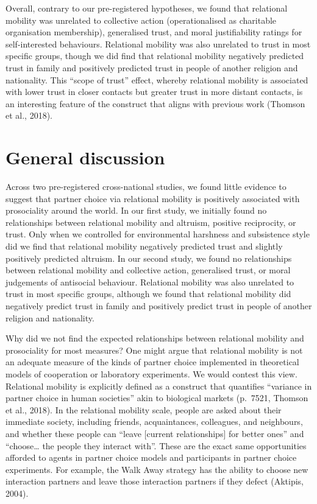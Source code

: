 \documentclass[
  man,floatsintext]{apa6}
\begin{document}
Overall, contrary to our pre-registered hypotheses, we found that relational mobility was unrelated to collective action (operationalised as charitable organisation membership), generalised trust, and moral justifiability ratings for self-interested behaviours. Relational mobility was also unrelated to trust in most specific groups, though we did find that relational mobility negatively predicted trust in family and positively predicted trust in people of another religion and nationality. This ``scope of trust'' effect, whereby relational mobility is associated with lower trust in closer contacts but greater trust in more distant contacts, is an interesting feature of the construct that aligns with previous work (Thomson et al., 2018).

\hypertarget{general-discussion}{%
\section{General discussion}\label{general-discussion}}

Across two pre-registered cross-national studies, we found little evidence to suggest that partner choice via relational mobility is positively associated with prosociality around the world. In our first study, we initially found no relationships between relational mobility and altruism, positive reciprocity, or trust. Only when we controlled for environmental harshness and subsistence style did we find that relational mobility negatively predicted trust and slightly positively predicted altruism. In our second study, we found no relationships between relational mobility and collective action, generalised trust, or moral judgements of antisocial behaviour. Relational mobility was also unrelated to trust in most specific groups, although we found that relational mobility did negatively predict trust in family and positively predict trust in people of another religion and nationality.

Why did we not find the expected relationships between relational mobility and prosociality for most measures? One might argue that relational mobility is not an adequate measure of the kinds of partner choice implemented in theoretical models of cooperation or laboratory experiments. We would contest this view. Relational mobility is explicitly defined as a construct that quantifies ``variance in partner choice in human societies'' akin to biological markets (p.~7521, Thomson et al., 2018). In the relational mobility scale, people are asked about their immediate society, including friends, acquaintances, colleagues, and neighbours, and whether these people can ``leave {[}current relationships{]} for better ones'' and ``choose\ldots{} the people they interact with''. These are the exact same opportunities afforded to agents in partner choice models and participants in partner choice experiments. For example, the Walk Away strategy has the ability to choose new interaction partners and leave those interaction partners if they defect (Aktipis, 2004).
\end{document}
